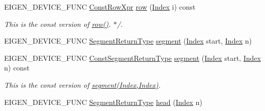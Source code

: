 \begin{DoxyCompactItemize}
\item 
\mbox{\label{class_eigen_1_1_sparse_matrix_base_af4e68009539a4959d04e63241c37574b}} 
E\+I\+G\+E\+N\+\_\+\+D\+E\+V\+I\+C\+E\+\_\+\+F\+U\+NC \mbox{\hyperlink{class_eigen_1_1_block}{Const\+Row\+Xpr}} \mbox{\hyperlink{class_eigen_1_1_sparse_matrix_base_af4e68009539a4959d04e63241c37574b}{row}} (\mbox{\hyperlink{struct_eigen_1_1_eigen_base_a554f30542cc2316add4b1ea0a492ff02}{Index}} i) const
\begin{DoxyCompactList}\small\item\em This is the const version of \mbox{\hyperlink{class_eigen_1_1_sparse_matrix_base_ac0a5563ed3f243f013fb9d2c17e230d0}{row()}}. $\ast$/. \end{DoxyCompactList}\item 
E\+I\+G\+E\+N\+\_\+\+D\+E\+V\+I\+C\+E\+\_\+\+F\+U\+NC \mbox{\hyperlink{class_eigen_1_1_vector_block}{Segment\+Return\+Type}} \mbox{\hyperlink{class_eigen_1_1_sparse_matrix_base_adf94a8461a773fb4b0daedaa9980b054}{segment}} (\mbox{\hyperlink{struct_eigen_1_1_eigen_base_a554f30542cc2316add4b1ea0a492ff02}{Index}} start, \mbox{\hyperlink{struct_eigen_1_1_eigen_base_a554f30542cc2316add4b1ea0a492ff02}{Index}} n)
\item 
\mbox{\label{class_eigen_1_1_sparse_matrix_base_a0310f6125518b5bd93314d07db2a5a6e}} 
E\+I\+G\+E\+N\+\_\+\+D\+E\+V\+I\+C\+E\+\_\+\+F\+U\+NC \mbox{\hyperlink{class_eigen_1_1_vector_block}{Const\+Segment\+Return\+Type}} \mbox{\hyperlink{class_eigen_1_1_sparse_matrix_base_a0310f6125518b5bd93314d07db2a5a6e}{segment}} (\mbox{\hyperlink{struct_eigen_1_1_eigen_base_a554f30542cc2316add4b1ea0a492ff02}{Index}} start, \mbox{\hyperlink{struct_eigen_1_1_eigen_base_a554f30542cc2316add4b1ea0a492ff02}{Index}} n) const
\begin{DoxyCompactList}\small\item\em This is the const version of \mbox{\hyperlink{class_eigen_1_1_sparse_matrix_base_adf94a8461a773fb4b0daedaa9980b054}{segment(\+Index,\+Index)}}. \end{DoxyCompactList}\item 
E\+I\+G\+E\+N\+\_\+\+D\+E\+V\+I\+C\+E\+\_\+\+F\+U\+NC \mbox{\hyperlink{class_eigen_1_1_vector_block}{Segment\+Return\+Type}} \mbox{\hyperlink{class_eigen_1_1_sparse_matrix_base_a6b3f24af4a70e2824a52fbe909872274}{head}} (\mbox{\hyperlink{struct_eigen_1_1_eigen_base_a554f30542cc2316add4b1ea0a492ff02}{Index}} n)

\end{DoxyCompactItemize}
